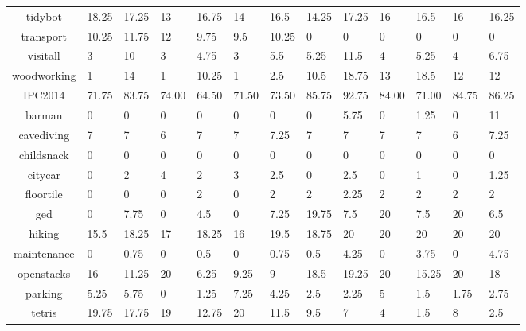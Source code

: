 \begin{table*}[htbp]
\begin{tabularx}{\linewidth}{|c|X|X|X|X|X|X||X|X|X|X|X|X|}
tidybot         & 18.25  & 17.25  & 13     & 16.75  & 14     & 16.5   & 14.25  & 17.25  & 16     & 16.5   & 16     & 16.25  \\ 
transport       & 10.25  & 11.75  & 12     & 9.75   & 9.5    & 10.25  & 0      & 0      & 0      & 0      & 0      & 0      \\ 
visitall        & 3      & 10     & 3      & 4.75   & 3      & 5.5    & 5.25   & 11.5   & 4      & 5.25   & 4      & 6.75   \\ 
woodworking     & 1      & 14     & 1      & 10.25  & 1      & 2.5    & 10.5   & 18.75  & 13     & 18.5   & 12     & 12     \\[0.3em]
IPC2014         & 71.75  & 83.75  & 74.00  & 64.50  & 71.50  & 73.50  & 85.75  & 92.75  & 84.00  & 71.00  & 84.75  & 86.25  \\[0.3em]
barman          & 0      & 0      & 0      & 0      & 0      & 0      & 0      & 5.75   & 0      & 1.25   & 0      & 11     \\ 
cavediving      & 7      & 7      & 6      & 7      & 7      & 7.25   & 7      & 7      & 7      & 7      & 6      & 7.25   \\ 
childsnack      & 0      & 0      & 0      & 0      & 0      & 0      & 0      & 0      & 0      & 0      & 0      & 0      \\ 
citycar         & 0      & 2      & 4      & 2      & 3      & 2.5    & 0      & 2.5    & 0      & 1      & 0      & 1.25   \\ 
floortile       & 0      & 0      & 0      & 2      & 0      & 2      & 2      & 2.25   & 2      & 2      & 2      & 2      \\ 
ged             & 0      & 7.75   & 0      & 4.5    & 0      & 7.25   & 19.75  & 7.5    & 20     & 7.5    & 20     & 6.5    \\ 
hiking          & 15.5   & 18.25  & 17     & 18.25  & 16     & 19.5   & 18.75  & 20     & 20     & 20     & 20     & 20     \\ 
maintenance     & 0      & 0.75   & 0      & 0.5    & 0      & 0.75   & 0.5    & 4.25   & 0      & 3.75   & 0      & 4.75   \\ 
openstacks      & 16     & 11.25  & 20     & 6.25   & 9.25   & 9      & 18.5   & 19.25  & 20     & 15.25  & 20     & 18     \\ 
parking         & 5.25   & 5.75   & 0      & 1.25   & 7.25   & 4.25   & 2.5    & 2.25   & 5      & 1.5    & 1.75   & 2.75   \\ 
tetris          & 19.75  & 17.75  & 19     & 12.75  & 20     & 11.5   & 9.5    & 7      & 4      & 1.5    & 8      & 2.5    \\ 

\end{tabularx}
\end{table*}
